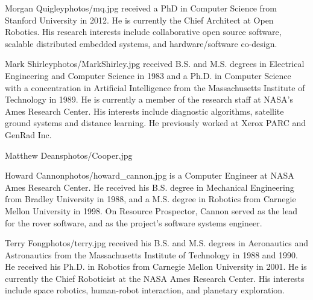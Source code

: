 \documentclass[twocolumn,letterpaper]{IEEEAerospaceCLS}  %
\begin{document}
\begin{biographywithpic}
{Morgan Quigley}{photos/mq.jpg} received a PhD in Computer Science from Stanford University in 2012. He is currently the Chief Architect at Open Robotics. His research interests include collaborative open source software, scalable distributed embedded systems, and hardware/software co-design.
\end{biographywithpic} 

\begin{biographywithpic}
{Mark Shirley}{photos/MarkShirley.jpg} received B.S. and M.S. degrees in Electrical Engineering and Computer Science in 1983 and a Ph.D. in Computer Science with a concentration in Artificial Intelligence from the Massachusetts Institute of Technology in 1989.  He is currently a member of the research staff at NASA's Ames Research Center.  His interests include diagnostic algorithms, satellite ground systems and distance learning.  He previously worked at Xerox PARC and GenRad Inc.
\end{biographywithpic} 

\begin{biographywithpic}
{Matthew Deans}{photos/Cooper.jpg} 
\end{biographywithpic} 

\begin{biographywithpic}
{Howard Cannon}{photos/howard_cannon.jpg} is a Computer Engineer at NASA Ames Research Center. He received his B.S. degree in Mechanical Engineering from Bradley University in 1988, and a M.S. degree in Robotics from Carnegie Mellon University in 1998. On Resource Prospector, Cannon served as the lead for the rover software, and as the project's software systems engineer. 
\end{biographywithpic} 

\begin{biographywithpic}
{Terry Fong}{photos/terry.jpg} received his B.S. and M.S. degrees in Aeronautics and Astronautics from the Massachusetts Institute of Technology in 1988 and 1990. He received his Ph.D. in Robotics from Carnegie Mellon University in 2001. He is currently the Chief Roboticist at the NASA Ames Research Center. His interests include space robotics, human-robot interaction, and planetary exploration. 
\end{biographywithpic} 
\end{document}
